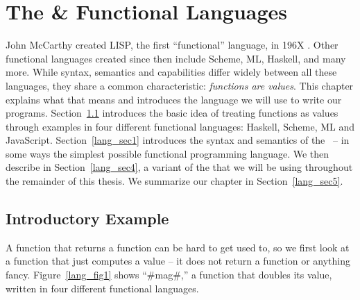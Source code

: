 \documentclass[12pt]{report}
\begin{document}


\chapter{The \LamA \& Functional Languages}
\label{ref_chapter_languages}


John McCarthy created LISP, the first ``functional'' language, in 196X
\citep{McCarthy}. Other functional languages created since then
include Scheme, ML, Haskell, and many more. While syntax, semantics
and capabilities differ widely between all these languages, they share
a common characteristic: \emph{functions are values}.  This chapter
explains what that means and introduces the language we will use to
write our programs. Section~\ref{lang_sec2} introduces the basic idea
of treating functions as values through examples in four different
functional languages: Haskell, Scheme, ML and
JavaScript. Section~\ref{lang_sec1} introduces the syntax and
semantics of the \lamA\ -- in some ways the simplest possible
functional programming language. We then describe \lamC in
Section~\ref{lang_sec4}, a variant of the \lamA that we will be using
throughout the remainder of this thesis. We summarize our chapter in
Section~\ref{lang_sec5}.

\section{Introductory Example}
\label{lang_sec2}
A function that returns a function can be hard to get used to, so we
first look at a function that just computes a value -- it does not
return a function or anything fancy.  Figure~\ref{lang_fig1} shows
``#mag#,'' a function that doubles its value, written in four
different functional languages.
\end{document}
